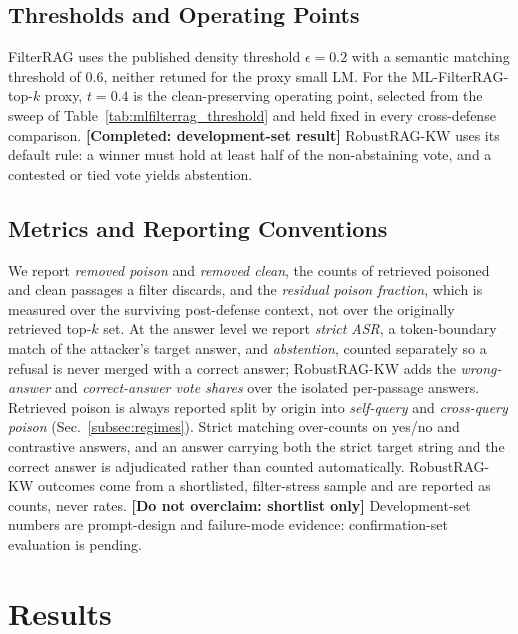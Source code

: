 \documentclass[conference]{IEEEtran}
\newcommand{\COMPLETED}[1]{\textbf{[Completed: #1]}}
\newcommand{\NOOVERCLAIM}[1]{\textbf{[Do not overclaim: #1]}}
\newcommand{\mlthresh}{0.4}      %
\begin{document}
\subsection{Thresholds and Operating Points}
\label{subsec:thresholds}
FilterRAG uses the published density threshold $\epsilon=0.2$ with a semantic
matching threshold of $0.6$, neither retuned for the proxy small LM. For the
ML-FilterRAG-top-$k$ proxy, $t=\mlthresh$ is the clean-preserving operating
point, selected from the sweep of Table~\ref{tab:mlfilterrag_threshold} and held
fixed in every cross-defense comparison. \COMPLETED{development-set result}
RobustRAG-KW uses its default rule: a winner must hold at least half of the
non-abstaining vote, and a contested or tied vote yields abstention.

\subsection{Metrics and Reporting Conventions}
We report \emph{removed poison} and \emph{removed clean}, the counts of retrieved
poisoned and clean passages a filter discards, and the \emph{residual poison
fraction}, which is measured over the surviving post-defense context, not over
the originally retrieved top-$k$ set. At the answer level we report \emph{strict
ASR}, a token-boundary match of the attacker's target answer, and
\emph{abstention}, counted separately so a refusal is never merged with a correct
answer; RobustRAG-KW adds the \emph{wrong-answer} and \emph{correct-answer vote
shares} over the isolated per-passage answers. Retrieved poison is always
reported split by origin into \emph{self-query} and \emph{cross-query poison}
(Sec.~\ref{subsec:regimes}). Strict matching over-counts on yes/no and
contrastive answers, and an answer carrying both the strict target string and the
correct answer is adjudicated rather than counted automatically. RobustRAG-KW
outcomes come from a shortlisted, filter-stress sample and are reported as
counts, never rates. \NOOVERCLAIM{shortlist only} Development-set numbers are
prompt-design and failure-mode evidence: confirmation-set evaluation is pending.

\section{Results}
\label{sec:results}
\end{document}
